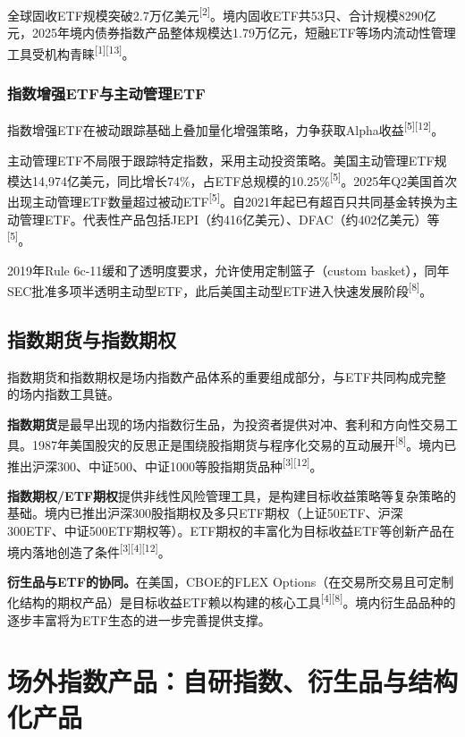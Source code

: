 \documentclass[10pt,a4paper,twocolumn]{ctexart}
\begin{document}
全球固收ETF规模突破2.7万亿美元\textsuperscript{[2]}。境内固收ETF共53只、合计规模8290亿元，2025年境内债券指数产品整体规模达1.79万亿元，短融ETF等场内流动性管理工具受机构青睐\textsuperscript{[1][13]}。

\subsubsection{指数增强ETF与主动管理ETF}

指数增强ETF在被动跟踪基础上叠加量化增强策略，力争获取Alpha收益\textsuperscript{[5][12]}。

主动管理ETF不局限于跟踪特定指数，采用主动投资策略。美国主动管理ETF规模达14,974亿美元，同比增长74\%，占ETF总规模的10.25\%\textsuperscript{[5]}。2025年Q2美国首次出现主动管理ETF数量超过被动ETF\textsuperscript{[5]}。自2021年起已有超百只共同基金转换为主动管理ETF。代表性产品包括JEPI（约416亿美元）、DFAC（约402亿美元）等\textsuperscript{[5]}。

2019年Rule 6c-11缓和了透明度要求，允许使用定制篮子（custom basket），同年SEC批准多项半透明主动型ETF，此后美国主动型ETF进入快速发展阶段\textsuperscript{[8]}。

\subsection{指数期货与指数期权}

指数期货和指数期权是场内指数产品体系的重要组成部分，与ETF共同构成完整的场内指数工具链。

\textbf{指数期货}是最早出现的场内指数衍生品，为投资者提供对冲、套利和方向性交易工具。1987年美国股灾的反思正是围绕股指期货与程序化交易的互动展开\textsuperscript{[8]}。境内已推出沪深300、中证500、中证1000等股指期货品种\textsuperscript{[3][12]}。

\textbf{指数期权/ETF期权}提供非线性风险管理工具，是构建目标收益策略等复杂策略的基础。境内已推出沪深300股指期权及多只ETF期权（上证50ETF、沪深300ETF、中证500ETF期权等）。ETF期权的丰富化为目标收益ETF等创新产品在境内落地创造了条件\textsuperscript{[3][4][12]}。

\textbf{衍生品与ETF的协同。}在美国，CBOE的FLEX Options（在交易所交易且可定制化结构的期权产品）是目标收益ETF赖以构建的核心工具\textsuperscript{[4][8]}。境内衍生品品种的逐步丰富将为ETF生态的进一步完善提供支撑。

\section{场外指数产品：自研指数、衍生品与结构化产品}
\end{document}
